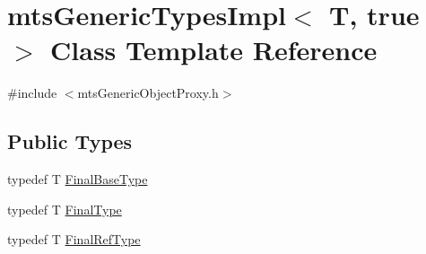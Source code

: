 \hypertarget{classmts_generic_types_impl_3_01_t_00_01true_01_4}{\section{mts\-Generic\-Types\-Impl$<$ T, true $>$ Class Template Reference}
\label{classmts_generic_types_impl_3_01_t_00_01true_01_4}
}


{\ttfamily \#include $<$mts\-Generic\-Object\-Proxy.\-h$>$}

\subsection*{Public Types}
\begin{DoxyCompactItemize}
\item 
typedef T \hyperlink{classmts_generic_types_impl_3_01_t_00_01true_01_4_a3d735609254b24b78bc37157a3d9ce35}{Final\-Base\-Type}
\item 
typedef T \hyperlink{classmts_generic_types_impl_3_01_t_00_01true_01_4_a1ff3e9267a5ad6d54eaec1c50114bca2}{Final\-Type}
\item 
typedef T \hyperlink{classmts_generic_types_impl_3_01_t_00_01true_01_4_a76ded5912b20f9057bf7835ca04cfb89}{Final\-Ref\-Type}
\end{DoxyCompactItemize}

